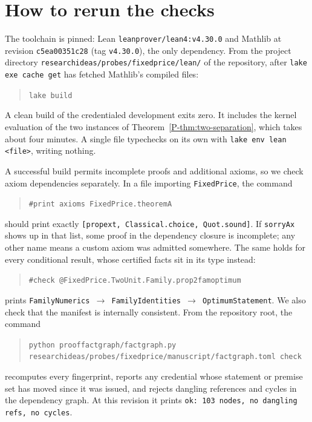 \documentclass[11pt]{article}
\newcommand{\pref}[1]{\ref*{P-#1}}
\newcommand{\lean}[1]{\begingroup\def\_{\textunderscore\allowbreak}\texttt{\small #1}\endgroup}
\begin{document}
\section{How to rerun the checks}

The toolchain is pinned: Lean \lean{leanprover/lean4:v4.30.0} and Mathlib at
revision \lean{c5ea00351c28} (tag \lean{v4.30.0}), the only dependency. From
the project directory
\lean{research\_ideas/probes/fixed\_price/lean/} of the repository,
after \lean{lake exe cache get} has fetched Mathlib's compiled files:

\begin{quote}
\lean{lake build}
\end{quote}

A clean build of the credentialed development exits zero. It includes the
kernel evaluation of the two instances of
Theorem~\pref{thm:two-separation}, which takes about four minutes. A single
file typechecks on its own with \lean{lake env lean <file>}, writing
nothing.

A successful build permits incomplete proofs and additional axioms, so
we check axiom dependencies separately. In a file importing
\lean{FixedPrice}, the command

\begin{quote}
\lean{\#print axioms FixedPrice.theoremA}
\end{quote}

should print exactly \lean{[propext, Classical.choice, Quot.sound]}. If
\lean{sorryAx} shows up in that list, some proof in the dependency closure
is incomplete; any other name means a custom axiom was admitted somewhere.
The same holds for every conditional result, whose certified facts sit in
its type instead:

\begin{quote}
\lean{\#check @FixedPrice.TwoUnit.Family.prop\_2fam\_optimum}
\end{quote}

prints \lean{FamilyNumerics $\to$ FamilyIdentities $\to$ OptimumStatement}.
We also check that the manifest is internally consistent. From the
repository root, the command

\begin{quote}
\lean{python proof\_factgraph/factgraph.py}\\
\lean{research\_ideas/probes/fixed\_price/manuscript/factgraph.toml check}
\end{quote}

recomputes every fingerprint, reports any credential whose statement or
premise set has moved since it was issued, and rejects dangling references
and cycles in the dependency graph. At this revision it prints
\lean{ok: 103 nodes, no dangling refs, no cycles}.
\end{document}
